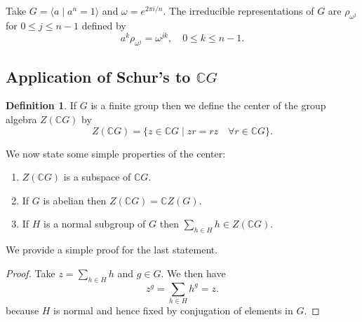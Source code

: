 \documentclass[11pt, notitlepage]{article}
\numberwithin{equation}{section}
\theoremstyle{plain}
\newtheorem{lemma}[theorem]{Lemma}
\theoremstyle{definition}
\newtheorem{definition}[theorem]{Definition}
\newenvironment{example}
	{\pushQED{\qed}\renewcommand{\qedsymbol}{$\blacktriangleleft$}\examplex}
	{\popQED\endexamplex}
\begin{document}

\begin{example}
Take $G=\langle a \mid a^n = 1 \rangle$ and $\omega = e^{2\pi i/n}$. The irreducible representations of $G$ are $\rho_{\omega^j}$ for $0 \leq j \leq n-1$ defined by
\[
	a^k \rho_{\omega^j} = \omega^{jk}, \quad 0 \leq k \leq n-1.
\]
\end{example}


%



\subsection{Application of Schur's to $\mathbb{C}G$}

\begin{definition}
If $G$ is a finite group then we define the center of the group algebra $Z(\mathbb{C}G)$ by
\[
	Z(\mathbb{C}G) = \{ z \in\mathbb{C}G \mid zr = rz \quad\forall r\in\mathbb{C}G \}.
\]
\end{definition}

We now state some simple properties of the center:
\begin{enumerate}
	\item $Z(\mathbb{C}G)$ is a subspace of $\mathbb{C}G$.
	\item If $G$ is abelian then $Z(\mathbb{C}G) = \mathbb{C}Z(G)$.
	\item If $H$ is a normal subgroup of $G$ then $\sum_{h \in H} h \in Z(\mathbb{C}G)$.
\end{enumerate}
We provide a simple proof for the last statement.
\begin{proof}
Take $z=\sum_{h \in H} h$ and $g\in G$. We then have
\[
	z^g = \sum_{h \in H} h^g = z.
\]
because $H$ is normal and hence fixed by conjugation of elements in $G$. 
\end{proof}
\end{document}
